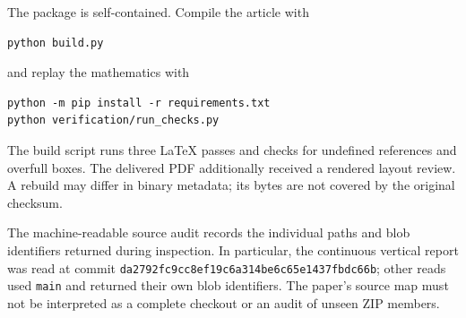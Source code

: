 \documentclass[11pt,a4paper]{article}
\numberwithin{equation}{section}
\theoremstyle{definition}
\theoremstyle{remark}
\newcommand{\src}[1]{\nolinkurl{#1}}
\begin{document}
The package is self-contained. Compile the article with
\begin{verbatim}
python build.py
\end{verbatim}
and replay the mathematics with
\begin{verbatim}
python -m pip install -r requirements.txt
python verification/run_checks.py
\end{verbatim}
The build script runs three LaTeX passes and checks for undefined
references and overfull boxes. The delivered PDF additionally
received a rendered layout review. A rebuild may differ in binary
metadata; its bytes are not covered by the original checksum.

The machine-readable source audit records the individual paths and
blob identifiers returned during inspection. In particular, the
continuous vertical report was read at commit
\src{da2792fc9cc8ef19c6a314be6c65e1437fbdc66b}; other reads used
\src{main} and returned their own blob identifiers. The paper's
source map must not be interpreted as a complete checkout or an
audit of unseen ZIP members.
\end{document}
